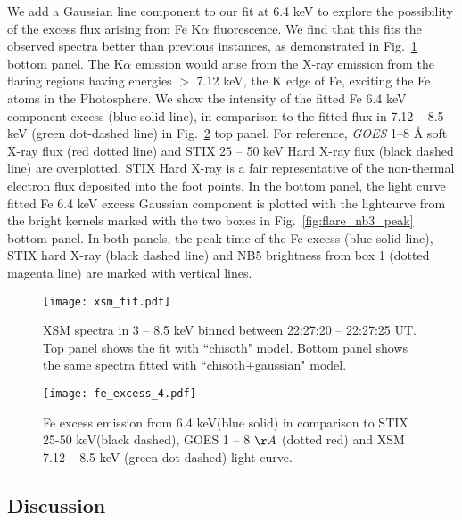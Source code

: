 We add a Gaussian line component to our fit at 6.4 keV to explore the possibility of the excess flux arising from Fe K$\alpha$ fluorescence. We find that this fits the observed spectra better than previous instances, as demonstrated in Fig.~\ref{fig:xsm_fit} bottom panel. The K$\alpha$ emission would arise from the X-ray emission from the flaring regions having energies $>$ 7.12 keV, the K edge of Fe, exciting the Fe atoms in the Photosphere. We show the intensity of the fitted Fe 6.4 keV component excess (blue solid line), in comparison to the fitted flux in 7.12 {--} 8.5 keV (green dot-dashed line) in Fig.~\ref{fig:fe_excess} top panel. For reference, {\it GOES} 1{--}8 {\AA} soft X-ray flux (red dotted line) and STIX 25 {--} 50 keV Hard X-ray flux (black dashed line) are overplotted. STIX Hard X-ray is a fair representative of the non-thermal electron flux deposited into the foot points. In the bottom panel, the light curve fitted Fe 6.4 keV excess Gaussian component is plotted with the lightcurve from the bright kernels marked with the two boxes in Fig.~\ref{fig:flare_nb3_peak} bottom panel. In both panels, the peak time of the Fe excess (blue solid line), STIX hard X-ray (black dashed line) and NB5 brightness from box 1 (dotted magenta line) are marked with vertical lines.

\begin{figure}[ht!]
    \centering
    \texttt{[image: xsm\_fit.pdf]}
    \caption[Fits of the observed XSM spectra.]{XSM spectra in 3 {--} 8.5 keV binned between 22:27:20 {--} 22:27:25 UT. Top panel shows the fit with ``chisoth" model. Bottom panel shows the same spectra fitted with ``chisoth+gaussian" model.}
    \label{fig:xsm_fit}
\end{figure}

\begin{figure}[ht!]
\centering
    \texttt{[image: fe\_excess\_4.pdf]}
    \caption[Fe excess light curve as a function of time.]{Fe excess emission from 6.4 keV(blue solid) in comparison to STIX 25-50 keV(black dashed), GOES 1 {--} 8 $\AA$ (dotted red) and XSM 7.12 {--} 8.5 keV (green dot-dashed) light curve.}
    \label{fig:fe_excess}
\end{figure}

\subsection{Discussion}\label{sec:dis1}

